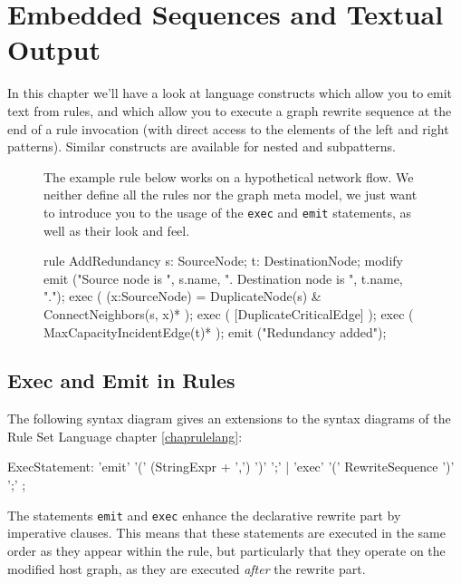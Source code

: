 \chapter{Embedded Sequences and Textual Output}
\label{cha:imperativeandstate}
\label{sct:imperative}

In this chapter we'll have a look at language constructs which allow you to emit text from rules, and which allow you to execute a graph rewrite sequence at the end of a rule invocation (with direct access to the elements of the left and right patterns).
Similar constructs are available for nested and subpatterns.

\begin{figure}[htbp]
\begin{example}
	The example rule below works on a hypothetical network flow.
	We neither define all the rules nor the graph meta model,
	we just want to introduce you to the usage of the \texttt{exec} and \texttt{emit} statements, as well as their look and feel.
	\begin{grgen}
rule AddRedundancy
{
  s: SourceNode;
  t: DestinationNode;
  modify {
    emit ("Source node is ", s.name, ". Destination node is ", t.name, ".");
    exec ( (x:SourceNode) = DuplicateNode(s) & ConnectNeighbors(s, x)* );
    exec ( [DuplicateCriticalEdge] );
    exec ( MaxCapacityIncidentEdge(t)* );
    emit ("Redundancy added");
  }
}
	\end{grgen}
\end{example}
\end{figure}

\section{Exec and Emit in Rules}\label{sct:execemitrules}

The following syntax diagram gives an extensions to the syntax diagrams of the Rule Set Language chapter \ref{chaprulelang}:
\begin{rail}
  ExecStatement: 'emit' '(' (StringExpr + ',') ')' ';' | 'exec' '(' RewriteSequence ')' ';'
	;
\end{rail}

The statements \texttt{emit} and \texttt{exec} enhance the declarative rewrite part by imperative clauses.
This means that these statements are executed in the same order as they appear within the rule,
but particularly that they operate on the modified host graph, as they are executed \emph{after} the rewrite part.

